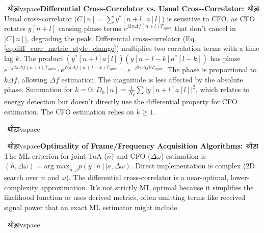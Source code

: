 \documentclass[11pt]{article}
\newenvironment{projectquestion}[1]
{\par\ थोड़ाvspace{\topsep}\noindent\textbf{#1}\ थोड़ा\quad\ignorespaces}
{\par\ थोड़ाvspace{\topsep}}
\begin{document}
			\begin{projectquestion}{Differential Cross-Correlator vs. Usual Cross-Correlator:}
				Usual cross-correlator ($C[n] = \sum y^*[n+l]a[l]$) is sensitive to CFO, as CFO rotates $y[n+l]$ causing phase terms $e^{j2\pi\Delta f (n+l)T_{symb}}$ that don't cancel in $|C[n]|$, degrading the peak.
				Differential cross-correlator (Eq. \ref{eq:diff_corr_metric_style_change}) multiplies two correlation terms with a time lag $k$. The product $(y^*[n+l]a[l])(y[n+l-k]a^*[l-k])$ has phase $e^{-j2\pi\Delta f(n+l)T_{symb}} \cdot e^{j2\pi\Delta f(n+l-k)T_{symb}} = e^{-j2\pi\Delta f k T_{symb}}$. The phase is proportional to $k\Delta f$, allowing $\Delta f$ estimation. The magnitude is less affected by the absolute phase.
				Summation for $k=0$: $D_0[n] = \frac{1}{N_p}\sum |y[n+l]a[l]|^2$, which relates to energy detection but doesn't directly use the differential property for CFO estimation. The CFO estimation relies on $k \ge 1$.
			\end{projectquestion}
			
			\begin{projectquestion}{Optimality of Frame/Frequency Acquisition Algorithms:}
				The ML criterion for joint ToA ($\hat{n}$) and CFO ($\Delta\omega$) estimation is $(\hat{n},\Delta\omega)= \text{arg max}_{n,\omega} p(y[n]|a,\Delta\omega)$. Direct implementation is complex (2D search over $n$ and $\omega$). The differential cross-correlator is a near-optimal, lower-complexity approximation. It's not strictly ML optimal because it simplifies the likelihood function or uses derived metrics, often omitting terms like received signal power that an exact ML estimator might include.
			\end{projectquestion}
			
		
\end{document}
